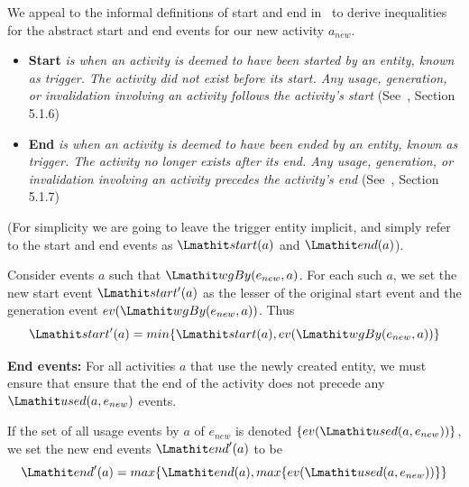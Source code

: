 We appeal to the informal definitions of start and end in~\citep{w3c-prov-dm} to derive inequalities for the abstract start and end events for our new activity $a_{new}$.
% 
\begin{itemize}
\item \textbf{Start} \textit{is when an activity is deemed to have been started by an entity, known as trigger. The activity did not exist before its start. Any usage, generation, or invalidation involving an activity follows the activity's start} (See~\citep{w3c-prov-dm},  Section 5.1.6)

\item \textbf{End} \textit{is when an activity is deemed to have been ended by an entity, known as trigger. The activity no longer exists after its end. Any usage, generation, or invalidation involving an activity precedes the activity's end} (See~\citep{w3c-prov-dm}, Section 5.1.7)
\end{itemize}
(For simplicity we are going to leave the trigger entity implicit, and simply refer to the start and end events as $\start(a)$ and $\ed(a)$).

\begin{definition} 
\label{def:abstract-start-e}
Consider events $a$ such that $\wgby(e_{new},a)$. For each such $a$, we set the new start event $\start'(a)$ as the lesser of the original start event and the generation event $ev(\wgby(e_{new},a))$. Thus
\begin{equation}
\start'(a) = min\{\start(a),ev(\wgby(e_{new},a))\}
\end{equation}
\end{definition}

{\bf End events:} For all activities $a$ that use the newly created entity, we must ensure that ensure that the end of the activity does not precede any $\used(a,e_{new})$ events.
\begin{definition}
  \label{def:abstract-end-e}
  If the set of all usage events by $a$ of $e_{new}$ is denoted $\{ev(\used(a,e_{new}))\}$, we set the new end events $\ed'(a)$ to be
  \begin{equation}
  \ed'(a) = max\{\ed(a), max\{ev(\used(a,e_{new}))\}\}
\end{equation}
\end{definition}

